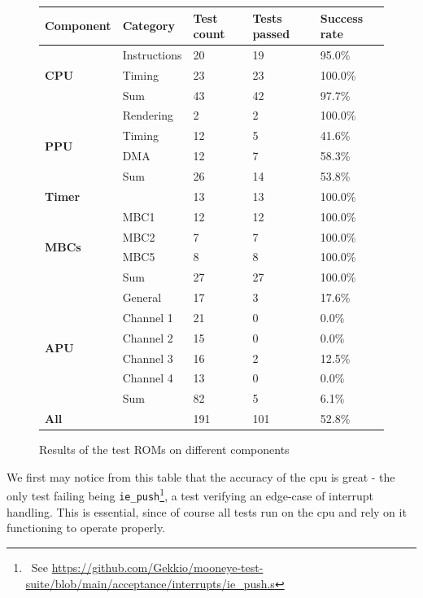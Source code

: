 \documentclass[11pt]{informatics-report}
\newcommand{\ftnt}[1]{\footnote{~See \url{#1}}}
\begin{document}
\begin{figure}[h]
    \centering
    \begin{tabular}{|l|l|l|l|l|}
    \hline
    \textbf{Component} & \textbf{Category} & \textbf{Test count} & \textbf{Tests passed} & \textbf{Success rate} \\ \hline
	\multirow{3}{*}{\textbf{CPU}}
    & Instructions & 20 & 19 &  95.0\% \\
    &       Timing & 23 & 23 & 100.0\% \\\cline{2-5}
    &          Sum & 43 & 42 &  97.7\% \\\hline
	\multirow{4}{*}{\textbf{PPU}}
    &    Rendering &  2 &  2 & 100.0\% \\
    &       Timing & 12 &  5 &  41.6\% \\
    &          DMA & 12 &  7 &  58.3\% \\\cline{2-5}
    &          Sum & 26 & 14 &  53.8\% \\\hline
    \multicolumn{2}{|l|}{\textbf{Timer}} & 13 & 13 & 100.0\% \\\hline
   	\multirow{4}{*}{\textbf{MBCs}}
    &         MBC1 & 12 & 12 & 100.0\% \\
    &         MBC2 &  7 &  7 & 100.0\% \\
    &         MBC5 &  8 &  8 & 100.0\% \\\cline{2-5}
    &          Sum & 27 & 27 & 100.0\% \\\hline
   	\multirow{6}{*}{\textbf{APU}}
    &      General & 17 &  3 &  17.6\% \\
    &    Channel 1 & 21 &  0 &   0.0\% \\
    &    Channel 2 & 15 &  0 &   0.0\% \\
    &    Channel 3 & 16 &  2 &  12.5\% \\
    &    Channel 4 & 13 &  0 &   0.0\% \\\cline{2-5}
    &          Sum & 82 &  5 &   6.1\% \\\hline
    \multicolumn{2}{|l|}{\textbf{All}} & 191 & 101 & 52.8\% \\\hline
    \end{tabular}
    \caption{Results of the test ROMs on different components}
    \label{fig:stats-tests-absolute}
\end{figure}

We first may notice from this table that the accuracy of the \gls{cpu} is great - the only test failing being \texttt{ie\_push}\ftnt{https://github.com/Gekkio/mooneye-test-suite/blob/main/acceptance/interrupts/ie\_push.s}, a test verifying an edge-case of interrupt handling. This is essential, since of course all tests run on the \gls{cpu} and rely on it functioning to operate properly.
\end{document}
